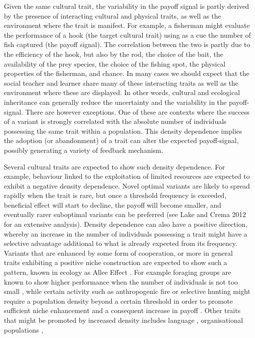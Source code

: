\documentclass[preprint,authoryear]{elsarticle}
\begin{document}
Given the same cultural trait, the variability in the payoff signal is partly derived by the presence of interacting cultural and physical traits, as well as the environment where the trait is manifest. For example, a fisherman might evaluate the performance of a hook (the target cultural trait) using as a cue the number of fish captured (the payoff signal). The correlation between the two is partly due to the efficiency of the hook, but also by the rod, the choice of the bait, the availability of the prey species, the choice of the fishing spot, the physical properties of the fisherman, and chance. In many cases we should expect that the social teacher and learner share many of these interacting traits as well as the environment where these are displayed. In other words, cultural and ecological inheritance can generally reduce the uncertainty and the variability in the payoff-signal. There are however exceptions. One of these are contexts where the success of a variant is strongly correlated with the absolute number of individuals possessing the same trait within a population. This density dependence implies the adoption (or abandonment) of a trait can alter the expected payoff-signal, possibly generating a variety of feedback mechanism.  

Several cultural traits are expected to show such density dependence. For example, behaviour linked to the exploitation of limited resources are expected to exhibit a negative density dependence. Novel optimal variants are likely to spread rapidly when the trait is rare, but once a threshold frequency is exceeded,  beneficial effect will start to decline, the payoff will become smaller, and eventually rarer suboptimal variants can be preferred (see Lake and Crema 2012 for an extensive analysis). Density dependence can also have a positive direction, whereby an increase in the number of individuals possessing a trait might have a selective advantage additional to what is already expected from its frequency. Variants that are enhanced by some form of cooperation, or more in general traits exhibiting a positive niche construction are expected to show such a pattern, known in ecology as Allee Effect \citep{allee1958}. For example foraging groups are known to show higher performance when the number of individuals is not too small \citep{hill_and_hawkes_1983,janssen_and_hill_2014}, while certain activity such as anthropogenic fire \citep{bird2013} or selective hunting \citep{dods_2002} might require a population density beyond a certain threshold in order to promote sufficient niche enhancement and a consequent increase in payoff \citep{rowley-conwy_and_layton_2011}. Other traits that might be promoted by increased density includes language \citep{kandler2009}, organisational populations \citep{caroll_and_hannan_1989}, %
\end{document}
